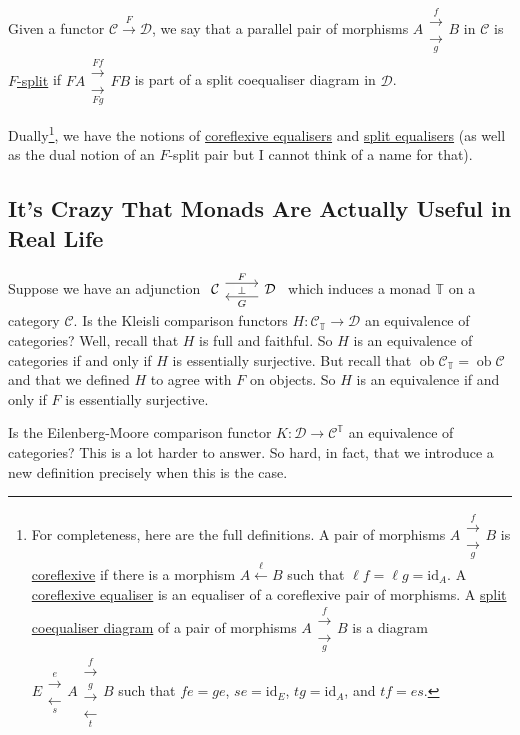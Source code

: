 \documentclass[a4paper,11pt]{article}
\theoremstyle{break_italics}
\theoremstyle{break_upright}
\theoremstyle{remark}
\newcommand{\id}{\mathrm{id}}
\newcommand{\ob}{\operatorname{ob}}
\newcommand{\C}{\mathcal{C}}
\newcommand{\D}{\mathcal{D}}
\begin{document}
Given a functor $\C \xrightarrow{F} \D$, we say that a parallel pair of morphisms $A \substack{\xrightarrow{f} \\ \xrightarrow[g]{}} B$ in $\C$ is \uline{$F$-split} if $FA \substack{\xrightarrow{Ff} \\ \xrightarrow[Fg]{}} FB$ is part of a split coequaliser diagram in $\D$.

Dually\footnote{For completeness, here are the full definitions. A pair of morphisms $A \substack{\xrightarrow{f} \\ \xrightarrow[g]{}} B$ is \uline{coreflexive} if there is a morphism $A \xleftarrow{\ell} B$ such that $\ell f = \ell g = \id_A$. A \uline{coreflexive equaliser} is an equaliser of a coreflexive pair of morphisms. A \uline{split coequaliser diagram} of a pair of morphisms $A \substack{\xrightarrow{f} \\ \xrightarrow[g]{}} B$ is a diagram $E \substack{\xrightarrow{e} \\ \xleftarrow[s]{}} A \substack{\xrightarrow{f} \\ \xrightarrow{g} \\ \xleftarrow[t]{}} B$ such that $fe = ge$, $se = \id_E$, $tg = \id_A$, and $tf = es$.}, we have the notions of \uline{coreflexive equalisers} and \uline{split equalisers} (as well as the dual notion of an $F$-split pair but I cannot think of a name for that).



\subsection{It’s Crazy That Monads Are Actually Useful in Real Life}

Suppose we have an adjunction $\begin{tikzcd}
	\C & \D
	\arrow["\bot"{description}, draw=none, from=1-1, to=1-2]
	\arrow["F", shift left=2, from=1-1, to=1-2]
	\arrow["G", shift left=2, from=1-2, to=1-1]
\end{tikzcd}$ which induces a monad $\mathbb T$ on a category $\C$. Is the Kleisli comparison functors $H \colon \C_{\mathbb T} \to \D$ an equivalence of categories? Well, recall that $H$ is full and faithful. So $H$ is an equivalence of categories if and only if $H$ is essentially surjective. But recall that $\ob\C_\mathbb T = \ob\C$ and that we defined $H$ to agree with $F$ on objects. So $H$ is an equivalence if and only if $F$ is essentially surjective.

Is the Eilenberg-Moore comparison functor $K \colon \D \to \C^{\mathbb T}$ an equivalence of categories? This is a lot harder to answer. So hard, in fact, that we introduce a new definition precisely when this is the case.
\end{document}
